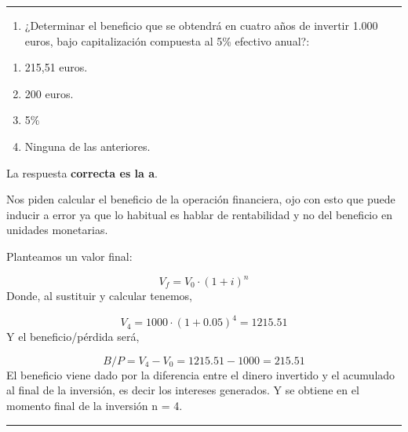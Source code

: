 \documentclass[
  letterpaper,
  DIV=11,
  numbers=noendperiod]{scrreprt}
\providecommand{\tightlist}{%
  \setlength{\itemsep}{0pt}\setlength{\parskip}{0pt}}\usepackage{longtable,booktabs,array}
\begin{document}
\begin{center}\rule{0.5\linewidth}{0.5pt}\end{center}

\begin{enumerate}
\def\labelenumi{\arabic{enumi}.}
\setcounter{enumi}{62}
\tightlist
\item
  ¿Determinar el beneficio que se obtendrá en cuatro años de invertir
  1.000 euros, bajo capitalización compuesta al 5\% efectivo anual?:
\end{enumerate}

\begin{enumerate}
\def\labelenumi{\alph{enumi}.}
\item
  215,51 euros.
\item
  200 euros.
\item
  5\%
\item
  Ninguna de las anteriores.
\end{enumerate}

\begin{tcolorbox}[enhanced jigsaw, left=2mm, opacityback=0, colback=white, breakable, arc=.35mm, bottomrule=.15mm, rightrule=.15mm, toprule=.15mm, leftrule=.75mm, colframe=quarto-callout-tip-color-frame]
\begin{minipage}[t]{5.5mm}
\textcolor{quarto-callout-tip-color}{\faLightbulb}
\end{minipage}%
\begin{minipage}[t]{\textwidth - 5.5mm}

La respuesta \textbf{correcta es la a}.

Nos piden calcular el beneficio de la operación financiera, ojo con esto
que puede inducir a error ya que lo habitual es hablar de rentabilidad y
no del beneficio en unidades monetarias.

Planteamos un valor final:

\[V_f=V_0\cdot\left(1+i\right)^n\] Donde, al sustituir y calcular
tenemos,

\[V_4=1000\cdot\left(1+0.05\right)^4=1215.51\] Y el beneficio/pérdida
será,

\[B/P=V_4-V_0=1215.51-1000=215.51\] El beneficio viene dado por la
diferencia entre el dinero invertido y el acumulado al final de la
inversión, es decir los intereses generados. Y se obtiene en el momento
final de la inversión n = 4.

\end{minipage}%
\end{tcolorbox}

\begin{center}\rule{0.5\linewidth}{0.5pt}\end{center}
\end{document}
